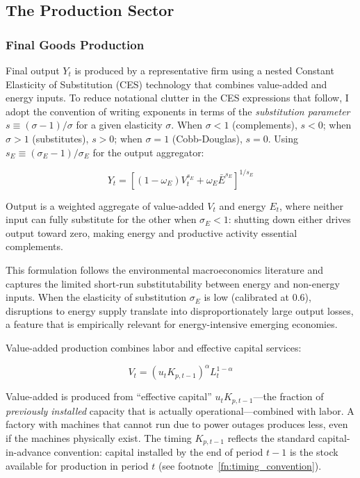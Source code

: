 \documentclass[12pt, a4paper]{article}
\begin{document}
\subsection{The Production Sector}

\subsubsection{Final Goods Production}

Final output $Y_t$ is produced by a representative firm using a nested Constant Elasticity of Substitution (CES) technology that combines value-added and energy inputs. To reduce notational clutter in the CES expressions that follow, I adopt the convention of writing exponents in terms of the \textit{substitution parameter} $s \equiv (\sigma - 1)/\sigma$ for a given elasticity $\sigma$. When $\sigma < 1$ (complements), $s < 0$; when $\sigma > 1$ (substitutes), $s > 0$; when $\sigma = 1$ (Cobb-Douglas), $s = 0$. Using $s_E \equiv (\sigma_E - 1)/\sigma_E$ for the output aggregator:

\begin{equation}
Y_t = \left[(1-\omega_E)V_t^{s_E} + \omega_E \bar{E}^{s_E}\right]^{1/s_E}
\label{eq:final_output}
\end{equation}

Output is a weighted aggregate of value-added $V_t$ and energy $E_t$, where neither input can fully substitute for the other when $\sigma_E < 1$: shutting down either drives output toward zero, making energy and productive activity essential complements.

This formulation follows the environmental macroeconomics literature \citep{heutel2012, airaudo2025green} and captures the limited short-run substitutability between energy and non-energy inputs. When the elasticity of substitution $\sigma_E$ is low (calibrated at 0.6), disruptions to energy supply translate into disproportionately large output losses, a feature that is empirically relevant for energy-intensive emerging economies.

Value-added production combines labor and effective capital services:

\begin{equation}
V_t = (u_t K_{p,t-1})^\alpha L_t^{1-\alpha}
\label{eq:value_added}
\end{equation}

Value-added is produced from ``effective capital'' $u_t K_{p,t-1}$---the fraction of \textit{previously installed} capacity that is actually operational---combined with labor. A factory with machines that cannot run due to power outages produces less, even if the machines physically exist. The timing $K_{p,t-1}$ reflects the standard capital-in-advance convention: capital installed by the end of period $t-1$ is the stock available for production in period $t$ (see footnote~\ref{fn:timing_convention}).
\end{document}
